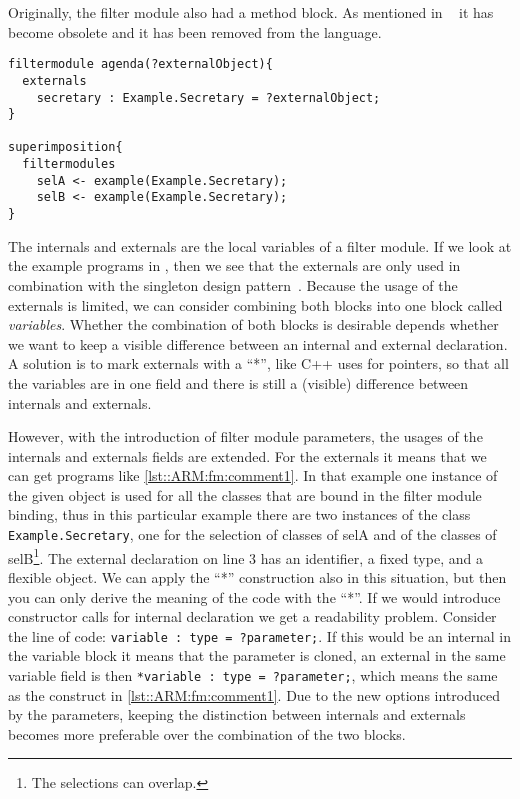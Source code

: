 Originally, the filter module also had a method block. 
As mentioned in ~\cite{Doornenbal2006} it has become obsolete and it has been removed from the language.

\begin{lstlisting}[caption = {A parameter as external object}, label = lst::ARM:fm:comment1,
style = listing, language =Composestar, float = tpb]
filtermodule agenda(?externalObject){
  externals
    secretary : Example.Secretary = ?externalObject;
}

superimposition{
  filtermodules
    selA <- example(Example.Secretary);
    selB <- example(Example.Secretary);
}
\end{lstlisting}
The internals and externals are the local variables of a filter module. 
If we look at the example programs in \Compose*, then we see that the externals are only used in combination with the singleton design pattern~\cite{Gamma95}. 
Because the usage of the externals is limited, we can consider combining both blocks into one block called \emph{variables}.
Whether the combination of both blocks is desirable depends whether we want to keep a visible difference between an internal and external declaration. 
A solution is to mark externals with a ``*'', like C++ uses for pointers, so that all the variables are in one field and there is still a (visible) difference between internals and externals.

However, with the introduction of filter module parameters, the usages of the internals and externals fields are extended.
For the externals it means that we can get programs like \autoref{lst::ARM:fm:comment1}. 
In that example one instance of the given object is used for all the classes that are bound in the filter module binding, thus in this particular example there are two instances of the class \lstinline!Example.Secretary!, one for the selection of classes of selA and of the classes of selB\footnote{The selections can overlap.}.
The external declaration on line 3 has an identifier, a fixed type, and a flexible object.
We can apply the ``*'' construction also in this situation, but then you can only derive the meaning of the code with the ``*''. If we would introduce constructor calls for internal declaration we get a readability problem.
Consider the line of code: \lstinline|variable : type = ?parameter;|. 
If this would be an internal in the variable block it means that the parameter is cloned, an external in the same variable field is then \lstinline|*variable : type = ?parameter;|, which means the same as the construct in \autoref{lst::ARM:fm:comment1}.
Due to the new options introduced by the parameters, keeping the distinction between internals and externals becomes more preferable over the combination of the two blocks.

